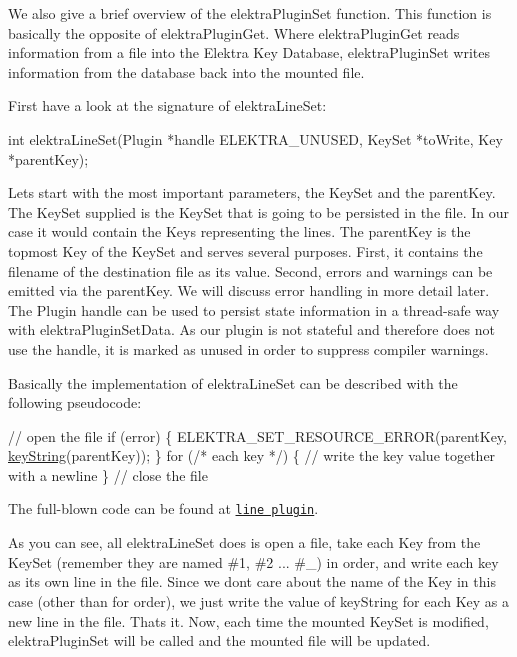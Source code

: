 We also give a brief overview of the {\ttfamily elektra\+Plugin\+Set} function. This function is basically the opposite of {\ttfamily elektra\+Plugin\+Get}. Where {\ttfamily elektra\+Plugin\+Get} reads information from a file into the Elektra Key Database, {\ttfamily elektra\+Plugin\+Set} writes information from the database back into the mounted file.

First have a look at the signature of {\ttfamily elektra\+Line\+Set}\+:


\begin{DoxyCode}
\textcolor{keywordtype}{int} elektraLineSet(Plugin *handle ELEKTRA\_UNUSED, KeySet *toWrite, Key *parentKey);
\end{DoxyCode}


Lets start with the most important parameters, the {\ttfamily Key\+Set} and the {\ttfamily parent\+Key}. The {\ttfamily Key\+Set} supplied is the {\ttfamily Key\+Set} that is going to be persisted in the file. In our case it would contain the Keys representing the lines. The {\ttfamily parent\+Key} is the topmost {\ttfamily Key} of the {\ttfamily Key\+Set} and serves several purposes. First, it contains the filename of the destination file as its value. Second, errors and warnings can be emitted via the {\ttfamily parent\+Key}. We will discuss error handling in more detail later. The Plugin handle can be used to persist state information in a thread-\/safe way with {\ttfamily elektra\+Plugin\+Set\+Data}. As our plugin is not stateful and therefore does not use the handle, it is marked as unused in order to suppress compiler warnings.

Basically the implementation of {\ttfamily elektra\+Line\+Set} can be described with the following pseudocode\+:


\begin{DoxyCode}
\textcolor{comment}{// open the file}
\textcolor{keywordflow}{if} (error)
\{
        ELEKTRA\_SET\_RESOURCE\_ERROR(parentKey, \hyperlink{group__keyvalue_ga880936f2481d28e6e2acbe7486a21d05}{keyString}(parentKey));
\}
\textcolor{keywordflow}{for} (\textcolor{comment}{/* each key */})
\{
        \textcolor{comment}{// write the key value together with a newline}
\}
\textcolor{comment}{// close the file}
\end{DoxyCode}


The full-\/blown code can be found at \href{https://master.libelektra.org/src/plugins/line/line.c}{\tt line plugin}.

As you can see, all {\ttfamily elektra\+Line\+Set} does is open a file, take each {\ttfamily Key} from the {\ttfamily Key\+Set} (remember they are named {\ttfamily \#1}, {\ttfamily \#2} ... {\ttfamily \#\+\_}) in order, and write each key as its own line in the file. Since we don\textquotesingle{}t care about the name of the {\ttfamily Key} in this case (other than for order), we just write the value of {\ttfamily key\+String} for each {\ttfamily Key} as a new line in the file. That\textquotesingle{}s it. Now, each time the mounted {\ttfamily Key\+Set} is modified, {\ttfamily elektra\+Plugin\+Set} will be called and the mounted file will be updated.

